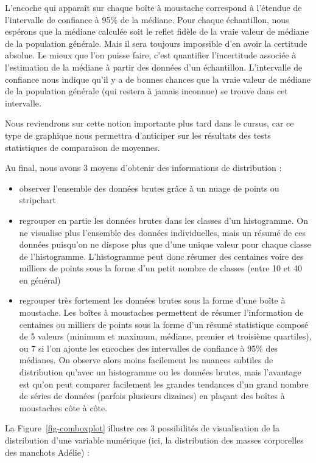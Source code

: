 \documentclass[
  letterpaper,
  DIV=11,
  numbers=noendperiod]{scrreprt}
\providecommand{\tightlist}{%
  \setlength{\itemsep}{0pt}\setlength{\parskip}{0pt}}\usepackage{longtable,booktabs,array}
\begin{document}
L'encoche qui apparaît sur chaque boîte à moustache correspond à
l'étendue de l'intervalle de confiance à 95\% de la médiane. Pour chaque
échantillon, nous espérons que la médiane calculée soit le reflet fidèle
de la vraie valeur de médiane de la population générale. Mais il sera
toujours impossible d'en avoir la certitude absolue. Le mieux que l'on
puisse faire, c'est quantifier l'incertitude associée à l'estimation de
la médiane à partir des données d'un échantillon. L'intervalle de
confiance nous indique qu'il y a de bonnes chances que la vraie valeur
de médiane de la population générale (qui restera à jamais inconnue) se
trouve dans cet intervalle.

Nous reviendrons sur cette notion importante plus tard dans le cursus,
car ce type de graphique nous permettra d'anticiper sur les résultats
des tests statistiques de comparaison de moyennes.

Au final, nous avons 3 moyens d'obtenir des informations de distribution
:

\begin{itemize}
\tightlist
\item
  observer l'ensemble des données brutes grâce à un nuage de points ou
  stripchart
\item
  regrouper en partie les données brutes dans les classes d'un
  histogramme. On ne visualise plus l'ensemble des données
  individuelles, mais un résumé de ces données puisqu'on ne dispose plus
  que d'une unique valeur pour chaque classe de l'histogramme.
  L'histogramme peut donc résumer des centaines voire des milliers de
  points sous la forme d'un petit nombre de classes (entre 10 et 40 en
  général)
\item
  regrouper très fortement les données brutes sous la forme d'une boîte
  à moustache. Les boîtes à moustaches permettent de résumer
  l'information de centaines ou milliers de points sous la forme d'un
  résumé statistique composé de 5 valeurs (minimum et maximum, médiane,
  premier et troisième quartiles), ou 7 si l'on ajoute les encoches des
  intervalles de confiance à 95\% des médianes. On observe alors moins
  facilement les nuances subtiles de distribution qu'avec un histogramme
  ou les données brutes, mais l'avantage est qu'on peut comparer
  facilement les grandes tendances d'un grand nombre de séries de
  données (parfois plusieurs dizaines) en plaçant des boîtes à
  moustaches côte à côte.
\end{itemize}

La Figure~\ref{fig-comboxplot} illustre ces 3 possibilités de
visualisation de la distribution d'une variable numérique (ici, la
distribution des masses corporelles des manchots Adélie) :
\end{document}
